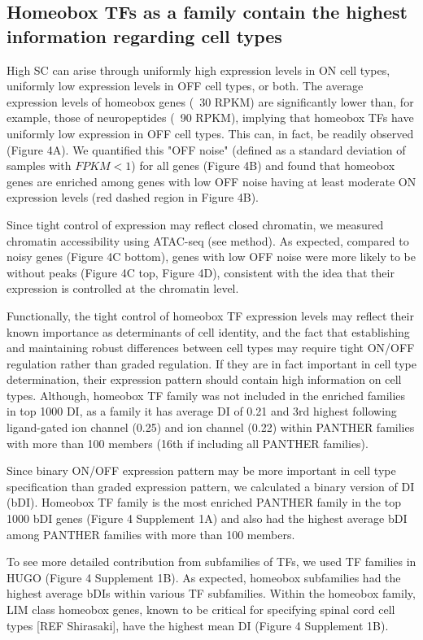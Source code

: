 \subsection{Homeobox TFs as a family contain the highest information regarding cell types}

High SC can arise through uniformly high expression levels in ON cell types, uniformly low expression levels in OFF cell types, or both. The average expression levels of homeobox genes (~30 RPKM) are significantly lower than, for example, those of  neuropeptides (~90 RPKM), implying that homeobox TFs have uniformly low expression in OFF cell types. This can, in fact, be readily observed (Figure 4A). We quantified this "OFF noise" (defined as a standard deviation of samples with $FPKM<1$) for all genes (Figure 4B) and found that homeobox genes are enriched among genes with low OFF noise having at least moderate ON expression levels (red dashed region in Figure 4B).

Since tight control of expression may reflect closed chromatin, we measured chromatin accessibility using ATAC-seq (see method). As expected, compared to noisy genes (Figure 4C bottom), genes with low OFF noise were more likely to be without peaks (Figure 4C top, Figure 4D), consistent with the idea that their expression is controlled at the chromatin level.

Functionally, the tight control of homeobox TF expression levels may reflect their known importance as determinants of cell identity, and the fact that establishing and maintaining robust differences between cell types may require tight ON/OFF regulation rather than graded regulation. If they are in fact important in cell type determination, their expression pattern should contain high information on cell types. Although, homeobox TF family was not included in the enriched families in top 1000 DI, as a family it has average DI of 0.21 and 3rd highest following ligand-gated ion channel (0.25) and ion channel (0.22) within PANTHER families with more than 100 members (16th if including all PANTHER families).  

Since binary ON/OFF expression pattern may be more important in cell type specification than graded expression pattern, we calculated a binary version of DI (bDI). Homeobox TF family is the most enriched PANTHER family in the top 1000 bDI genes (Figure 4 Supplement 1A) and also had the highest average bDI among PANTHER families with more than 100 members. 

To see more detailed contribution from subfamilies of TFs, we used TF families in HUGO (Figure 4 Supplement 1B). As expected, homeobox subfamilies had the highest average bDIs within various TF subfamilies. Within the homeobox family, LIM class homeobox genes, known to be critical for specifying spinal cord cell types [REF Shirasaki], have the highest mean DI (Figure 4 Supplement 1B). 

